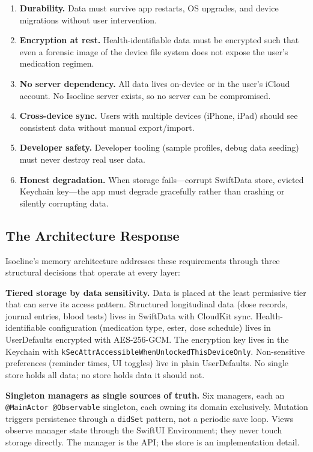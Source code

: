 \documentclass[11pt,a4paper]{article}
\newcommand{\code}[1]{\texttt{\small #1}}
\begin{document}
\begin{enumerate}[nosep,leftmargin=1.4em]
\item \textbf{Durability.} Data must survive app restarts, OS upgrades, and
  device migrations without user intervention.
\item \textbf{Encryption at rest.} Health-identifiable data must be encrypted
  such that even a forensic image of the device file system does not expose
  the user's medication regimen.
\item \textbf{No server dependency.} All data lives on-device or in the
  user's iCloud account. No Isocline server exists, so no server can be
  compromised.
\item \textbf{Cross-device sync.} Users with multiple devices (iPhone, iPad)
  should see consistent data without manual export/import.
\item \textbf{Developer safety.} Developer tooling (sample profiles, debug
  data seeding) must never destroy real user data.
\item \textbf{Honest degradation.} When storage fails---corrupt SwiftData
  store, evicted Keychain key---the app must degrade gracefully rather than
  crashing or silently corrupting data.
\end{enumerate}

\subsection{The Architecture Response}
\label{sec:architecture_response}

Isocline's memory architecture addresses these requirements through three
structural decisions that operate at every layer:

\textbf{Tiered storage by data sensitivity.} Data is placed at the least
permissive tier that can serve its access pattern. Structured longitudinal
data (dose records, journal entries, blood tests) lives in SwiftData with
CloudKit sync. Health-identifiable configuration (medication type, ester,
dose schedule) lives in UserDefaults encrypted with AES-256-GCM. The
encryption key lives in the Keychain with
\code{kSecAttrAccessibleWhenUnlockedThisDeviceOnly}. Non-sensitive
preferences (reminder times, UI toggles) live in plain UserDefaults. No
single store holds all data; no store holds data it should not.

\textbf{Singleton managers as single sources of truth.} Six managers, each an
\code{@MainActor @Observable} singleton, each owning its domain exclusively.
Mutation triggers persistence through a \code{didSet} pattern, not a periodic
save loop. Views observe manager state through the SwiftUI Environment; they
never touch storage directly. The manager is the API; the store is an
implementation detail.
\end{document}

